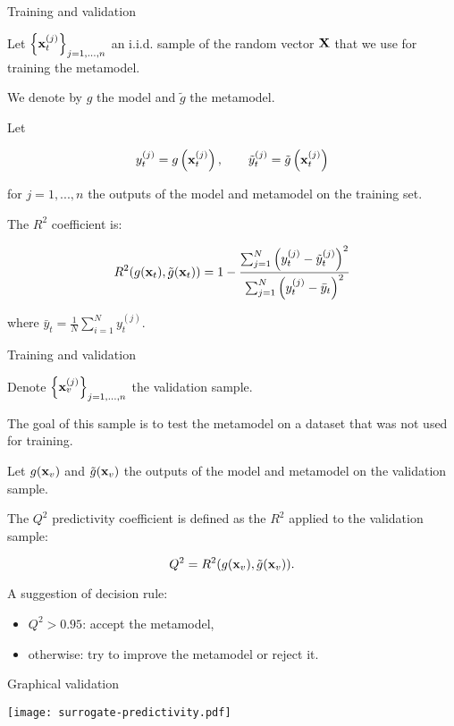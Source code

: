 \documentclass{beamer}
\begin{document}
\begin{frame}[t]{Training and validation}

Let $\left\{{\bf x}^{(j)}_t\right\}_{j=1,...,n}$ an i.i.d. sample 
of the random vector ${\bf X}$ that we use for training the 
metamodel. 

We denote by $g$ the model and $\tilde{g}$ the metamodel. 

Let 

$$
y^{(j)}_t = g\left({\bf x}^{(j)}_t\right), \qquad 
\tilde{y}^{(j)}_t = \tilde{g}\left({\bf x}^{(j)}_t\right)
$$

for $j=1,...,n$ the outputs of the model and metamodel 
on the training set.

The $R^2$ coefficient is: 

$$
R^2(g({\bf x}_t),\tilde{g}({\bf x}_t)) 
= 1 - \frac{ \sum_{j=1}^N \left( y^{(j)}_t - \tilde{y}^{(j)}_t \right)^2}
{ \sum_{j=1}^N \left( y^{(j)}_t - \bar{y}_t \right)^2 }
$$

where $\bar{y}_t = \frac{1} {N} \sum_{i=1}^N y^{(j)}_t$. 

\end{frame}


\begin{frame}[t]{Training and validation}

Denote $\left\{{\bf x}^{(j)}_v\right\}_{j=1,...,n}$ the 
validation sample. 

The goal of this sample is to test the metamodel on a dataset 
that was not used for training.

Let $g({\bf x}_v)$ and $\tilde{g}({\bf x}_v)$ the outputs of the 
model and metamodel on the validation sample.

The $Q^2$ predictivity coefficient is defined as the $R^2$ 
applied to the validation sample:

$$
Q^2 = R^2(g({\bf x}_v),\tilde{g}({\bf x}_v)).
$$

A suggestion of decision rule:
\begin{itemize}
\item $Q^2>0.95$: accept the metamodel,
\item otherwise: try to improve the metamodel or reject it.
\end{itemize}

\end{frame}


\begin{frame}[t]{Graphical validation}

\begin{center}
 \texttt{[image: surrogate-predictivity.pdf]}
\end{center}

\end{frame}
\end{document}
